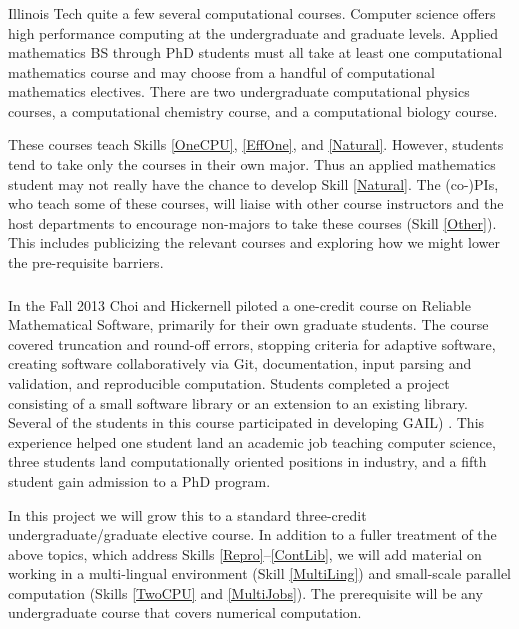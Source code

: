 \documentclass[11pt]{NSFamsart}
\begin{document}
\subsubsection{\CurrExistName} \label{CurrExist} Illinois Tech quite a few several computational courses.  Computer science offers high performance computing at the undergraduate and graduate levels.  Applied mathematics BS through PhD students must all take at least one computational mathematics course and may choose from a handful of computational mathematics electives. There are two undergraduate computational physics courses, a computational chemistry course, and a computational biology course.

These courses teach Skills \ref{OneCPU}, \ref{EffOne}, and \ref{Natural}.  However, students tend to take only the courses in their own major.  Thus an applied mathematics student may not really have the chance to develop Skill \ref{Natural}.  The (co-)PIs, who teach some of these courses, will liaise  with other course instructors and the host departments to encourage non-majors to take these courses (Skill \ref{Other}).  This includes publicizing the relevant courses and exploring how we might lower the pre-requisite barriers.

\subsubsection{\RelSoftName} \label{RelSoft} In the Fall 2013 Choi and Hickernell piloted a one-credit course on Reliable Mathematical Software, primarily for their own graduate students.  The course covered truncation and round-off errors,
stopping criteria for adaptive software,
creating software collaboratively via Git, 
documentation,
input parsing and validation, and
reproducible computation.
Students completed a project consisting of a small software library or an extension to an existing library.  Several of the students in this course participated in developing GAIL) \cite{ChoEtal17b}.  This experience helped one student land an academic job teaching computer science, three students land computationally oriented positions in industry, and a fifth student gain admission to a PhD program.

In this project we will grow this to a standard three-credit undergraduate/graduate elective course.  In addition to a fuller treatment of the above topics, which address Skills \ref{Repro}--\ref{ContLib}, we will add material on working in a multi-lingual environment (Skill \ref{MultiLing}) and small-scale parallel computation (Skills \ref{TwoCPU} and \ref{MultiJobs}).  The prerequisite will be any undergraduate course that covers numerical computation.
\end{document}

